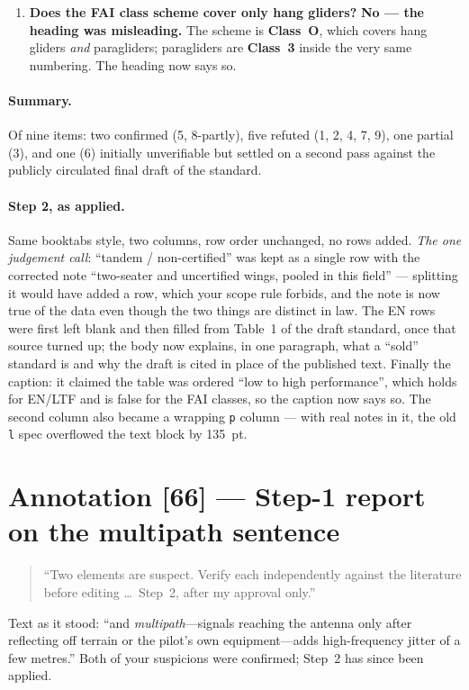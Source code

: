 \documentclass[11pt,a4paper]{article}
\newcommand{\note}[1]{\begingroup\small\color{qcol}\begin{quote}#1\end{quote}\endgroup}
\newcommand{\verdict}[1]{\textbf{\textcolor{vbad}{#1}}}
\begin{document}
\begin{enumerate}[leftmargin=1.4em, itemsep=0.5em]
\item \textbf{Does the FAI class scheme cover only hang gliders?} \verdict{No --- the
  heading was misleading.} The scheme is \textbf{Class~O}, which covers hang gliders
  \emph{and} paragliders; paragliders are \textbf{Class~3} inside the very same numbering.
  The heading now says so.
\end{enumerate}

\paragraph{Summary.} Of nine items: two confirmed (5, 8-partly), five refuted (1, 2, 4, 7,
9), one partial (3), and one (6) initially unverifiable but settled on a second pass
against the publicly circulated final draft of the standard.

\paragraph{Step 2, as applied.} Same booktabs style, two columns, row order unchanged, no
rows added. \emph{The one judgement call}: \enquote{tandem / non-certified} was kept as a
single row with the corrected note \enquote{two-seater and uncertified wings, pooled in
this field} --- splitting it would have added a row, which your scope rule forbids, and the
note is now true of the data even though the two things are distinct in law. The EN rows
were first left blank and then filled from Table~1 of the draft standard, once that source
turned up; the body now explains, in one paragraph, what a \enquote{sold} standard is and
why the draft is cited in place of the published text. Finally the caption: it claimed the
table was ordered \enquote{low to high performance}, which holds for EN/LTF and is false
for the FAI classes, so the caption now says so. The second column also became a wrapping
\texttt{p} column --- with real notes in it, the old \texttt{l} spec overflowed the text
block by \SI{135}{pt}.

\section{Annotation [66] --- Step-1 report on the multipath sentence}

\note{\enquote{Two elements are suspect. Verify each independently against the literature
before editing \dots\ Step~2, after my approval only.}}

\noindent
Text as it stood: \enquote{and \emph{multipath}---signals reaching the antenna only after
reflecting off terrain or the pilot's own equipment---adds high-frequency jitter of a few
metres.} Both of your suspicions were confirmed; Step~2 has since been applied.
\end{document}
